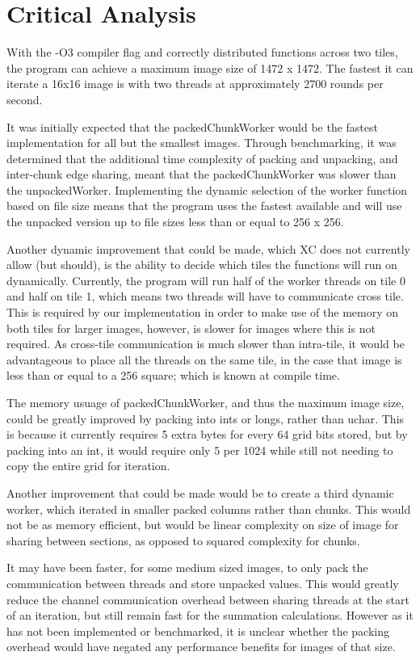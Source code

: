 \documentclass[11pt, oneside]{article}
\begin{document}
\pagebreak
\section{Critical Analysis}
With the -O3 compiler flag and correctly distributed functions across two tiles, the program can achieve a maximum image size of 1472 x 1472. The fastest it can iterate a 16x16 image is with two threads at approximately 2700 rounds per second.

It was initially expected that the packedChunkWorker would be the fastest implementation for all but the smallest images. Through benchmarking, it was determined that the additional time complexity of packing and unpacking, and inter-chunk edge sharing, meant that the packedChunkWorker was slower than the unpackedWorker. Implementing the dynamic selection of the worker function based on file size means that the program uses the fastest available and will use the unpacked version up to file sizes less than or equal to 256 x 256.

Another dynamic improvement that could be made, which XC does not currently allow (but should), is the ability to decide which tiles the functions will run on dynamically. Currently, the program will run half of the worker threads on tile 0 and half on tile 1, which means two threads will have to communicate cross tile. This is required by our implementation in order to make use of the memory on both tiles for larger images, however, is slower for images where this is not required. As cross-tile communication is much slower than intra-tile, it would be advantageous to place all the threads on the same tile, in the case that image is less than or equal to a 256 square; which is known at compile time.

The memory usuage of packedChunkWorker, and thus the maximum image size, could be greatly improved by packing into ints or longs, rather than uchar. This is because it currently requires 5 extra bytes for every 64 grid bits stored, but by packing into an int, it would require only 5 per 1024 while still not needing to copy the entire grid for iteration.

Another improvement that could be made would be to create a third dynamic worker, which iterated in smaller packed columns rather than chunks. This would not be as memory efficient, but would be linear complexity on size of image for sharing between sections, as opposed to squared complexity for chunks.

It may have been faster, for some medium sized images, to only pack the communication between threads and store unpacked values. This would greatly reduce the channel communication overhead between sharing threads at the start of an iteration, but still remain fast for the summation calculations. However as it has not been implemented or benchmarked, it is unclear whether the packing overhead would have negated any performance benefits for images of that size.
\end{document}
